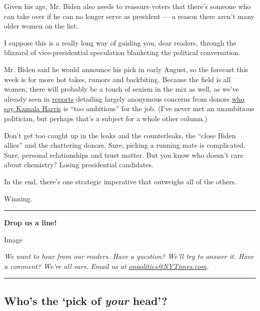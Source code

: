 Given his age, Mr. Biden also needs to reassure voters that there's
someone who can take over if he can no longer serve as president --- a
reason there aren't many older women on the list.

I suppose this is a really long way of guiding you, dear readers,
through the blizzard of vice-presidential speculation blanketing the
political conversation.

Mr. Biden said he would announce his pick in early August, so the
forecast this week is for more hot takes, rumors and backbiting. Because
the field is all women, there will probably be a touch of sexism in the
mix as well, as we've already seen in
\href{https://www.politico.com/news/2020/07/27/kamala-harris-biden-vp-381829}{reports}
detailing largely anonymous concerns from donors
\href{https://twitter.com/feliciasonmez/status/1288587415813345282}{who
say Kamala Harris} is ``too ambitious'' for the job. (I've never met an
unambitious politician, but perhaps that's a subject for a whole other
column.)

Don't get too caught up in the leaks and the counterleaks, the ``close
Biden allies'' and the chattering donors. Sure, picking a running mate
is complicated. Sure, personal relationships and trust matter. But you
know who doesn't care about chemistry? Losing presidential candidates.

In the end, there's one strategic imperative that outweighs all of the
others.

Winning.

\begin{center}\rule{0.5\linewidth}{\linethickness}\end{center}

\textbf{Drop us a line!}

Image

\emph{We want to hear from our readers. Have a question? We'll try to
answer it. Have a comment? We're all ears. Email us at}
\href{mailto:onpolitics@NYTimes.com}{\emph{onpolitics@NYTimes.com}}\emph{.}

\begin{center}\rule{0.5\linewidth}{\linethickness}\end{center}

\hypertarget{whos-the-pick-of-your-head}{%
\subsection{\texorpdfstring{Who's the `pick of \emph{your}
head'?}{Who's the `pick of your head'?}}\label{whos-the-pick-of-your-head}}

